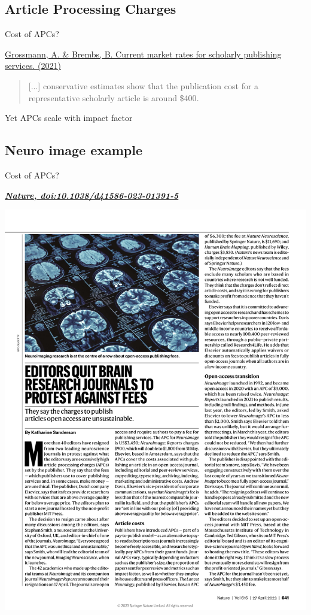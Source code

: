 \documentclass[10pt,compress,serif,aspectratio=169]{beamer}
\begin{document}
 \subsection{Article Processing Charges}
\begin{frame}[t]{Cost of APCs?}

  \href{https://doi.org/10.12688/f1000research.27468.2}{Grossmann, A. \& Brembs, B. Current market rates for scholarly publishing services. (2021)} 
  \begin{quote}
   [...] conservative estimates show that the publication cost for a representative scholarly article \alert{is around \$400}.
 \end{quote}
 \pause

 \begin{center}
 \alert{\Large Yet APCs scale with impact factor}\\
 \end{center}

 \pause
\end{frame}


\subsection{Neuro image example}
\begin{frame}[t]{Cost of APCs?}

  \href{https://doi.org/10.1038/d41586-023-01391-5}{\textit{\textbf{Nature, doi:10.1038/d41586-023-01391-5}}}\\\vspace{-.5cm}
  \begin{center}
    \includegraphics[width=.8\textwidth]{neuro-image-rebellion.pdf}
  \end{center}
\end{frame}
\end{document}
